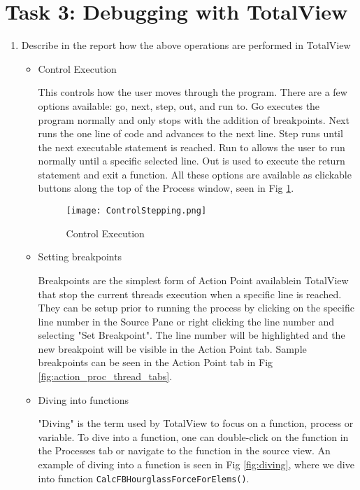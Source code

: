 \documentclass{article}
\begin{document}
\section{Task 3: Debugging with TotalView}
\begin{enumerate}
\item Describe in the report how the above operations are performed in TotalView
	\begin{itemize}
	\item Control Execution
	
	This controls how the user moves through the program. There are a few options available: go, next, step, out, and run to. Go executes the program normally and only stops with the addition of breakpoints. Next runs the one line of code and advances to the next line. Step runs until the next executable statement is reached. Run to allows the user to run normally until a specific selected line. Out is used to execute the return statement and exit a function. All these options are available as clickable buttons along the top of the Process window, seen in Fig \ref{fig:stepping}.
		\begin{figure}[p] %
		\begin{center}
			\texttt{[image: ControlStepping.png]}
		\caption{Control Execution}
		\label{fig:stepping}
		\end{center}
	\end{figure}
	\item Setting breakpoints
	
	Breakpoints are the simplest form of Action Point availablein TotalView that stop the current threads execution when a specific line is reached. They can be setup prior to running the process by clicking on the specific line number in the Source Pane or right clicking the line number and selecting "Set Breakpoint". The line number will be highlighted and the new breakpoint will be visible in the Action Point tab. Sample breakpoints can be seen in the Action Point tab in Fig \ref{fig:action_proc_thread_tabs}.
	\item Diving into functions
	
	"Diving" is the term used by TotalView to focus on a function, process or variable. To dive into a function, one can double-click on the function in the Processes tab or navigate to the function in the source view. An example of diving into a function is seen in Fig \ref{fig:diving}, where we dive into function \verb!CalcFBHourglassForceForElems()!.
	

\end{itemize}
\end{enumerate}
\end{document}

